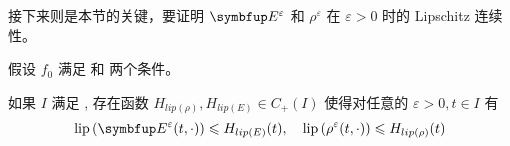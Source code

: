 




接下来则是本节的关键，要证明 $\vE^\varepsilon$ 和 $\rho^\varepsilon$ 在 $\varepsilon>0$ 时的 Lipschitz 连续性。
\begin{lemma}
    假设 $f_{0}$ 满足 \supremumf 和 \lipOffVsphere 两个条件。

    如果 $I$ 满足 \boundcondition, 存在函数 $H_{lip(\rho)}, H_{lip(E)} \in C_{+}(I)$ 使得对任意的 $\varepsilon>0, t \in I$ 有
        \[
        \operatorname{lip}\left(\vE^{\varepsilon}(t, \cdot)\right) \leqslant H_{lip(E)}(t), \quad \operatorname{lip}\left(\rho^{\varepsilon}(t, \cdot)\right) \leqslant H_{lip(\rho)}(t)
        \]
\end{lemma}


